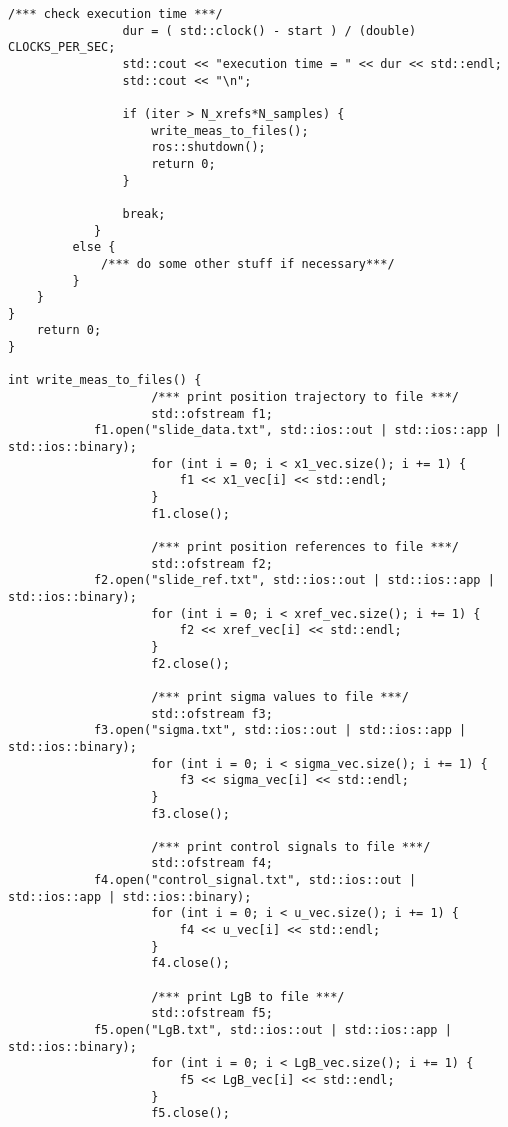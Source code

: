 \begin{lstlisting}[language=gedit]
                /*** check execution time ***/
                dur = ( std::clock() - start ) / (double) CLOCKS_PER_SEC;
                std::cout << "execution time = " << dur << std::endl; 
                std::cout << "\n";

                if (iter > N_xrefs*N_samples) {
                    write_meas_to_files();
                    ros::shutdown();
                    return 0;
                }

                break;
            }
         else {
             /*** do some other stuff if necessary***/
         }
    }
}
    return 0;
}
                    
int write_meas_to_files() {
                    /*** print position trajectory to file ***/
                    std::ofstream f1;
		    f1.open("slide_data.txt", std::ios::out | std::ios::app | std::ios::binary);
                    for (int i = 0; i < x1_vec.size(); i += 1) {
                        f1 << x1_vec[i] << std::endl;
                    }
                    f1.close();

                    /*** print position references to file ***/
                    std::ofstream f2;
		    f2.open("slide_ref.txt", std::ios::out | std::ios::app | std::ios::binary);
                    for (int i = 0; i < xref_vec.size(); i += 1) {
                        f2 << xref_vec[i] << std::endl;
                    }
                    f2.close();

                    /*** print sigma values to file ***/
                    std::ofstream f3;
		    f3.open("sigma.txt", std::ios::out | std::ios::app | std::ios::binary);
                    for (int i = 0; i < sigma_vec.size(); i += 1) {
                        f3 << sigma_vec[i] << std::endl;
                    }
                    f3.close();

                    /*** print control signals to file ***/
                    std::ofstream f4;
		    f4.open("control_signal.txt", std::ios::out | std::ios::app | std::ios::binary);
                    for (int i = 0; i < u_vec.size(); i += 1) {
                        f4 << u_vec[i] << std::endl;
                    }
                    f4.close();

                    /*** print LgB to file ***/
                    std::ofstream f5;
		    f5.open("LgB.txt", std::ios::out | std::ios::app | std::ios::binary);
                    for (int i = 0; i < LgB_vec.size(); i += 1) {
                        f5 << LgB_vec[i] << std::endl;
                    }
                    f5.close();


\end{lstlisting}
